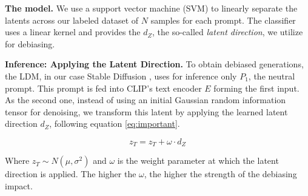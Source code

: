\noindent\textbf{The model.} We use a support vector machine (SVM) \cite{Vapnik2015} to linearly separate the latents across our labeled dataset of $N$ samples for each prompt. The classifier uses a linear kernel and provides the $d_{Z}$, the so-called \textit{latent direction}, we utilize for debiasing. 


\noindent\textbf{Inference: Applying the Latent Direction.}
To obtain debiased generations, the LDM, in our case Stable Diffusion \cite{rombach2022highresolution}, uses for inference only $P_{1}$, the neutral prompt. This prompt is fed into CLIP's text encoder $E$ forming the first input. As the second one, instead of using an initial Gaussian random information tensor for denoising, we transform this latent by applying the learned latent direction $d_{Z}$, following equation \ref{eq:important}. 

\begin{equation}
  z_{T} = z_{T} + \omega \cdot d_{Z}
  \label{eq:important}
\end{equation}

Where $z_{T} \sim N(\mu, \sigma^2)$ and $\omega$ is the weight parameter at which the latent direction is applied. The higher the $\omega$, the higher the strength of the debiasing impact. 





